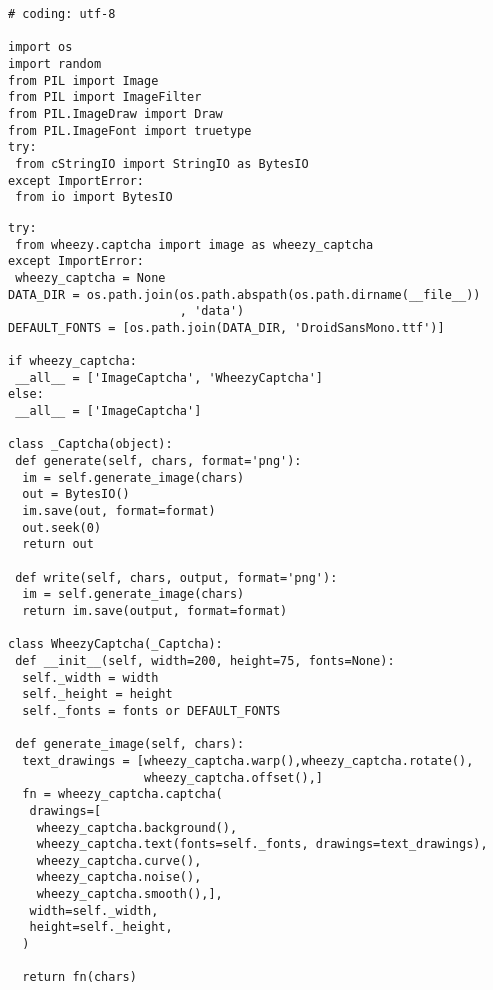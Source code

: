 \begin{lstlisting}[frame=single]
# coding: utf-8

import os
import random
from PIL import Image
from PIL import ImageFilter
from PIL.ImageDraw import Draw
from PIL.ImageFont import truetype
try:
 from cStringIO import StringIO as BytesIO
except ImportError:
 from io import BytesIO
\end{lstlisting}
\begin{lstlisting}[frame=single]
try:
 from wheezy.captcha import image as wheezy_captcha
except ImportError:
 wheezy_captcha = None
DATA_DIR = os.path.join(os.path.abspath(os.path.dirname(__file__))
                        , 'data')
DEFAULT_FONTS = [os.path.join(DATA_DIR, 'DroidSansMono.ttf')]

if wheezy_captcha:
 __all__ = ['ImageCaptcha', 'WheezyCaptcha']
else:
 __all__ = ['ImageCaptcha']

class _Captcha(object):
 def generate(self, chars, format='png'):
  im = self.generate_image(chars)
  out = BytesIO()
  im.save(out, format=format)
  out.seek(0)
  return out

 def write(self, chars, output, format='png'):
  im = self.generate_image(chars)
  return im.save(output, format=format)

class WheezyCaptcha(_Captcha):
 def __init__(self, width=200, height=75, fonts=None):
  self._width = width
  self._height = height
  self._fonts = fonts or DEFAULT_FONTS

 def generate_image(self, chars):
  text_drawings = [wheezy_captcha.warp(),wheezy_captcha.rotate(),
                   wheezy_captcha.offset(),]
  fn = wheezy_captcha.captcha(
   drawings=[
    wheezy_captcha.background(),
    wheezy_captcha.text(fonts=self._fonts, drawings=text_drawings),
    wheezy_captcha.curve(),
    wheezy_captcha.noise(),
    wheezy_captcha.smooth(),],
   width=self._width,
   height=self._height,
  )
  
  return fn(chars)
\end{lstlisting}
